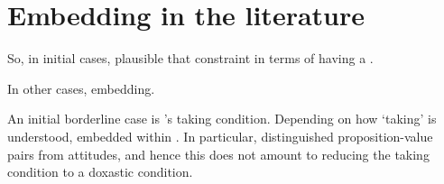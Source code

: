 \section{Embedding in the literature}
\label{cha:var:sec:embedding}

\begin{note}
  So, in initial cases, plausible that constraint in terms of having a \wit{}.

  In other cases, embedding.
\end{note}

\begin{note}
  An initial borderline case is \citeauthor{Boghossian:2014aa}'s taking condition.
  Depending on how `taking' is understood, embedded within \ros{}.
  In particular, distinguished proposition-value pairs from attitudes, and hence this does not amount to reducing the taking condition to a doxastic condition.
\end{note}

\subsubsection{\textcite{Thomson:1965vv}}

